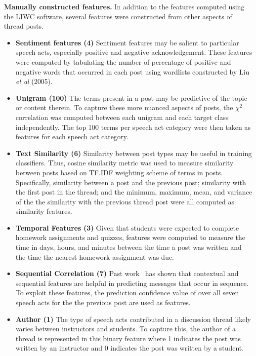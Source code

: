 \documentclass[twoside]{article}
\begin{document}
\textbf{Manually constructed features.} In addition to the features computed using the LIWC software, several features were constructed from other aspects of thread posts.
\begin{itemize}[noitemsep,nolistsep]
\item{\textbf{Sentiment features (4)} Sentiment features may be salient to particular speech acts, especially positive and negative acknowledgement. These features were computed by tabulating the number of percentage of positive and negative words that occurred in each post using wordlists constructed by Liu \emph{et al} (2005).~\cite{liu2005opinion}}
\item{\textbf{Unigram (100)} The terms present in a post may be predictive of the topic or content therein. To capture these more nuanced aspects of posts, the $\chi^2$ correlation was computed between each unigram and each target class independently. The top 100 terms per speech act category were then taken as features for each speech act category.}
\item{\textbf{Text Similarity (6)} Similarity between post types may be useful in training classifiers. Thus, cosine similarity metric was used to measure similarity between posts based on TF.IDF weighting scheme of terms in posts. Specifically, similarity between a post and the previous post; similarity with the first post in the thread; and the minimum, maximum, mean, and variance of the the similarity with the previous thread post were all computed as similarity features.}
\item{\textbf{Temporal Features (3)} Given that students were expected to complete homework assignments and quizzes, features were computed to measure the time in days, hours, and minutes between the time a post was written and the time the nearest homework assignment was due.}
\item{\textbf{Sequential Correlation (7)} Past work~\cite{carvalho2005collective} has shown that contextual and sequential features are helpful in predicting messages that occur in sequence. To exploit these features, the prediction confidence value of over all seven speech acts for the the previous post are used as features.}
\item{\textbf{Author (1)} The type of speech acts contributed in a discussion thread likely varies between instructors and students. To capture this, the author of a thread is represented in this binary feature where 1 indicates the post was written by an instructor and 0 indicates the post was written by a student.}

\end{itemize}
\end{document}
